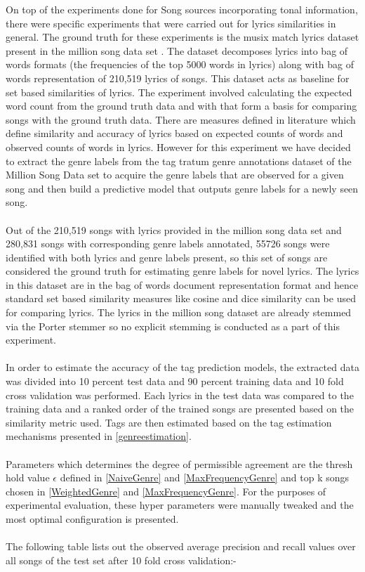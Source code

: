\noindent On top of the experiments done for Song sources incorporating tonal information, there were specific experiments that were carried out for lyrics similarities in general. The ground truth for these experiments is the musix match lyrics dataset present in the million song data set \cite{msd}. The dataset decomposes lyrics into bag of words formats (the frequencies of the top 5000 words in lyrics) along with bag of words representation of 210,519 lyrics of songs. This dataset acts as baseline for set based similarities of lyrics. The experiment involved calculating the expected word count from the ground truth data and with that form a basis for comparing songs with the ground truth data. There are measures defined in literature \cite{lyricsRanking} which define similarity and accuracy of lyrics based on expected counts of words and observed counts of words in lyrics. However for this experiment we have decided to extract the genre labels from the tag tratum genre annotations dataset of the Million Song Data set \cite{msd} to acquire the genre labels that are observed for a given song and then build a predictive model that outputs genre labels for a newly seen song. \\\\
Out of the 210,519 songs with lyrics provided in the million song data set and 280,831 songs with corresponding genre labels annotated, 55726 songs were identified with both lyrics and genre labels present, so this set of songs are considered the ground truth for estimating genre labels for novel lyrics. The lyrics in this dataset are in the bag of words document representation format and hence standard set based similarity measures like cosine and dice similarity can be used for comparing lyrics. The lyrics in the million song dataset are already stemmed via the Porter stemmer \cite{msd}  so no explicit stemming is conducted as a part of this experiment.\\\\
In order to estimate the accuracy of the tag prediction models, the extracted data was divided into 10 percent test data and 90 percent training data and 10 fold cross validation was performed. Each lyrics in the test data was compared to the training data and a ranked order of the trained songs are presented based on the similarity metric used. Tags are then estimated based on the tag estimation mechanisms presented in \ref{genreestimation}. \\\\
Parameters which determines the degree of permissible agreement are the thresh hold value $\epsilon$ defined in \ref{NaiveGenre} and \ref{MaxFrequencyGenre} and top k songs chosen in \ref{WeightedGenre} and \ref{MaxFrequencyGenre}. For the purposes of experimental evaluation, these hyper parameters were manually tweaked and the most optimal configuration is presented. \\\\
\noindent The following table lists out the observed average precision and recall values over all songs of the test set after 10 fold cross validation:- \\

